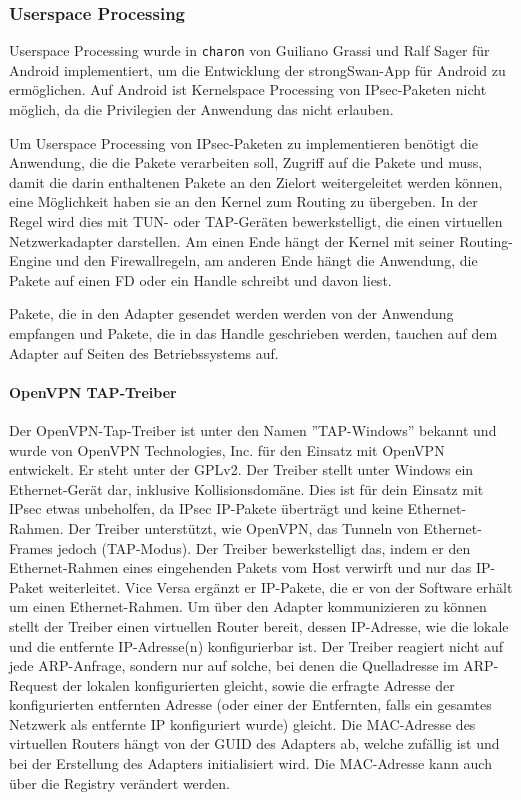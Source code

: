 \subsubsection{Userspace Processing}
Userspace Processing wurde in \texttt{charon} von Guiliano Grassi und Ralf Sager für Android implementiert,
um die Entwicklung der strongSwan-App für Android zu ermöglichen. Auf Android ist Kernelspace Processing
von \ac{IPsec}-Paketen nicht möglich, da die Privilegien der Anwendung das nicht erlauben.

Um Userspace Processing von \ac{IPsec}-Paketen zu implementieren benötigt
die Anwendung, die die Pakete verarbeiten soll, Zugriff auf die Pakete und muss,
damit die darin enthaltenen Pakete an den Zielort weitergeleitet werden können,
eine Möglichkeit haben sie an den Kernel zum Routing zu übergeben. In der Regel wird
dies mit TUN- oder TAP-Geräten bewerkstelligt, die einen virtuellen Netzwerkadapter
darstellen. Am einen Ende hängt der Kernel mit seiner Routing-Engine und den Firewallregeln,
am anderen Ende hängt die Anwendung, die Pakete auf einen \ac{FD} oder ein Handle schreibt
und davon liest.

Pakete, die in den Adapter gesendet werden werden von der Anwendung empfangen
und Pakete, die in das Handle geschrieben werden, tauchen auf dem Adapter auf Seiten
des Betriebssystems auf.

\paragraph{OpenVPN TAP-Treiber}
Der OpenVPN-Tap-Treiber ist unter den Namen ''TAP-Windows'' bekannt und wurde von
OpenVPN Technologies, Inc. für den Einsatz mit OpenVPN entwickelt.
Er steht unter der GPLv2.
Der Treiber stellt unter Windows ein Ethernet-Gerät dar, inklusive Kollisionsdomäne.
Dies ist für dein Einsatz mit \ac{IPsec} etwas unbeholfen, da \ac{IPsec} \ac{IP}-Pakete
überträgt und keine Ethernet-Rahmen.
Der Treiber unterstützt, wie OpenVPN, das Tunneln von Ethernet-Frames jedoch (TAP-Modus).
Der Treiber bewerkstelligt das, indem er den Ethernet-Rahmen eines eingehenden Pakets vom
Host verwirft und nur das IP-Paket weiterleitet. Vice Versa ergänzt er IP-Pakete, die er von
der Software erhält um einen Ethernet-Rahmen. Um über den Adapter kommunizieren zu können
stellt der Treiber einen virtuellen Router bereit, dessen \ac{IP}-Adresse, wie die lokale  und
die entfernte IP-Adresse(n) konfigurierbar ist.
Der Treiber reagiert nicht auf jede ARP-Anfrage, sondern nur auf solche, bei denen
die Quelladresse im ARP-Request der lokalen konfigurierten gleicht, sowie die erfragte Adresse
der konfigurierten entfernten Adresse (oder einer der Entfernten, falls ein gesamtes Netzwerk
als entfernte IP konfiguriert wurde) gleicht.
Die MAC-Adresse des virtuellen Routers hängt von der GUID des Adapters ab, welche zufällig ist
und bei der Erstellung des Adapters initialisiert wird. Die MAC-Adresse kann 
auch über die Registry verändert werden.

